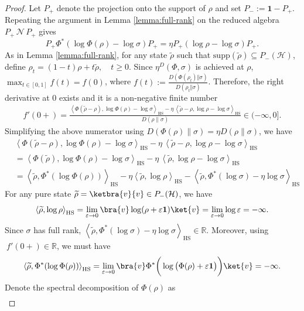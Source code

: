 \documentclass[11pt,reqno]{amsart}
\numberwithin{equation}{section}
\newcommand{\mb}{\mathbb}
\newcommand{\wt}{\widetilde}
\newcommand{\mc}{\mathcal}
\newcommand{\HS}[2]{\left\langle #1,#2\right\rangle_{\mathrm{HS}}} %
\begin{document}
\begin{proof}
Let $P_+$ denote the projection onto the support of $\rho$ and set $P_-:= \textbf{1} - P_+$. Repeating the argument  in Lemma \ref{lemma:full-rank} on the reduced algebra \(P_{+}\,\mc N\, P_{+}\) gives
\begin{equation}\label{eqn:equality on the support}
    P_+ \Phi^*(\log \Phi(\rho) - \log \sigma) P_+ = \eta P_+ (\log \rho - \log \sigma)P_+.
\end{equation}
As in Lemma \ref{lemma:full-rank}, for any state $\wt \rho$ such that $\mathrm{supp}(\wt \rho) \subseteq P_-(\mc H)$, define $ \rho_t = (1-t)\rho + t \wt \rho, \quad t \ge 0$. Since $\eta^D(\Phi,\sigma)$ is achieved at $\rho$, $\max_{t \in [0,1]}f(t) = f(0)$, where $f(t):=\frac{D(\Phi(\rho_{t})\Vert\sigma)}{D(\rho_{t}\Vert\sigma)}$. Therefore, the right derivative at $0$ exists and it is a non-negative finite number
\begin{align*}
     f'(0+) = \frac{\HS{\Phi(\wt \rho - \rho)}{\log \Phi(\rho) - \log \sigma}-\eta\, \HS{\wt \rho - \rho}{\log \rho - \log \sigma}}{D(\rho \|\sigma)} \in (-\infty,0].
\end{align*}
Simplifying the above numerator using $D(\Phi(\rho)\|\sigma) = \eta D(\rho \|\sigma)$, we have 
\begin{align*}
    & \HS{\Phi(\wt \rho - \rho)}{\log \Phi(\rho) - \log \sigma}-\eta\, \HS{\wt \rho - \rho}{\log \rho - \log \sigma} \\
    & = \HS{\Phi(\wt \rho)}{\log \Phi(\rho) - \log \sigma}-\eta\, \HS{\wt \rho}{\log \rho - \log \sigma} \\
    & = \HS{\wt \rho}{\Phi^*(\log \Phi(\rho))} - \eta \HS{\wt \rho}{\log \rho} - \HS{\wt \rho}{\Phi^*(\log \sigma) - \eta \log \sigma}
\end{align*}
For any pure state $\wt \rho = \ketbra{v}{v} \in P_-(\mc H)$, we have 
$$\HS{\wt \rho}{\log \rho} = \lim_{\varepsilon \to 0}\bra{v} \log (\rho + \varepsilon \textbf{1}) \ket{v} = \lim_{\varepsilon \to 0} \log \varepsilon= -\infty.$$ 
Since $\sigma$ has full rank, $\HS{\wt \rho}{\Phi^*(\log \sigma) - \eta \log \sigma}\in \mb R$. Moreover, using $\ f'(0+)\in \mb R$, we must have 
\begin{equation}\label{eqn:key-eqn minus infinity2}
    \HS{\wt \rho}{\Phi^*(\log \Phi(\rho))} = \lim_{\varepsilon \to 0} \bra{v} \Phi^*\bigg( \log \big( \Phi(\rho ) + \varepsilon \textbf{1}\big) \bigg) \ket{v} = -\infty.
\end{equation}
Denote the spectral decomposition of $\Phi(\rho)$ as 
\begin{align*}

\end{align*}
\end{proof}
\end{document}
